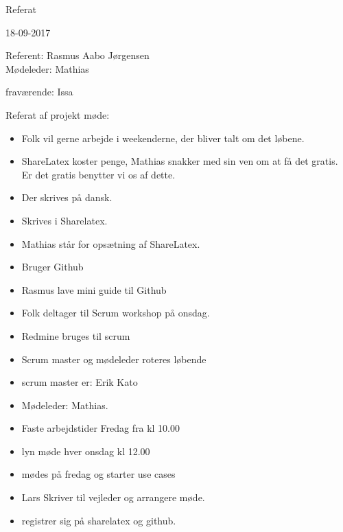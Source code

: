 \documentclass[a4paper,oneside,article]{memoir}
\begin{document}
	\begin{center}
		{\Huge Referat}
	\end{center}
	\begin{flushright}
		18-09-2017
	\end{flushright}

Referent: Rasmus Aabo Jørgensen\\

Mødeleder: Mathias

fraværende: Issa

\begin{center}

Referat af projekt møde:

\begin{itemize}
	\item Folk vil gerne arbejde i weekenderne, der bliver talt om det løbene.
	\item ShareLatex koster penge, Mathias snakker med sin ven om at få det gratis. Er det gratis benytter vi os af dette.
	\item Der skrives på dansk.
	\item Skrives i Sharelatex.
	\item Mathias står for opsætning af ShareLatex.
	\item Bruger Github
	\item Rasmus lave mini guide til Github
	\item Folk deltager til Scrum workshop på onsdag.
	\item Redmine bruges til scrum
	\item Scrum master og mødeleder roteres løbende
	\item scrum master er: Erik Kato  
	\item Mødeleder: Mathias.
	\item Faste arbejdstider Fredag fra kl 10.00
	\item lyn møde hver onsdag kl 12.00
	\item mødes på fredag og starter use cases
	\item Lars Skriver til vejleder og arrangere møde.
	\item registrer sig på sharelatex og github.
	
\end{itemize}	
\end{center}

	
\end{document}
